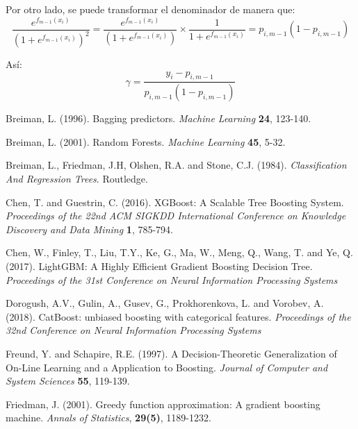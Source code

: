 \documentclass[12pt,twoside]{article}
\begin{document}
Por otro lado, se puede transformar el denominador de manera que:
\begin{equation*}
\frac{e^{f_{m-1}(x_i)}}{(1 + e^{f_{m-1}(x_i)})^2} = \frac{e^{f_{m-1}(x_i)}}{(1 + e^{f_{m-1}(x_i)})} \times \frac{1}{1 + e^{f_{m-1}(x_i)}} = p_{i, m-1}(1 - p_{i, m-1})
\end{equation*}

Así:
\begin{equation*}
\gamma = \frac{y_i - p_{i, m-1}}{p_{i, m-1}(1 - p_{i, m-1})}
\end{equation*}





\newpage
{}
\begin{thebibliography}{100}
 Breiman, L. (1996). Bagging predictors. \textit{Machine Learning} \textbf{24}, 123-140.

 Breiman, L. (2001). Random Forests. \textit{Machine Learning} \textbf{45}, 5-32.

 Breiman, L., Friedman, J.H, Olshen, R.A. and Stone, C.J. (1984).
\textit{Classification And Regression Trees}. Routledge.

 Chen, T. and Guestrin, C. (2016). XGBoost: A Scalable Tree Boosting System. \textit{Proceedings of the 22nd ACM SIGKDD International Conference on Knowledge Discovery and Data Mining} \textbf{1}, 785-794.

 Chen, W., Finley, T., Liu, T.Y., Ke, G., Ma, W., Meng, Q., Wang, T. and Ye, Q. (2017). LightGBM: A Highly Efficient Gradient Boosting Decision Tree. \textit{Proceedings of the 31st Conference on Neural Information Processing Systems}

 Dorogush, A.V., Gulin, A., Gusev, G., Prokhorenkova, L. and Vorobev, A. (2018). CatBoost: unbiased boosting with categorical features. \textit{Proceedings of the 32nd Conference on Neural Information Processing Systems}


 Freund, Y. and Schapire, R.E. (1997). A Decision-Theoretic Generalization of On-Line Learning and a Application to Boosting. \textit{Journal of Computer and System Sciences} \textbf{55}, 119-139.

 Friedman, J. (2001). Greedy function approximation: A gradient boosting machine. \textit{Annals of Statistics}, \textbf{29(5)}, 1189-1232.



\end{thebibliography}
\end{document}

